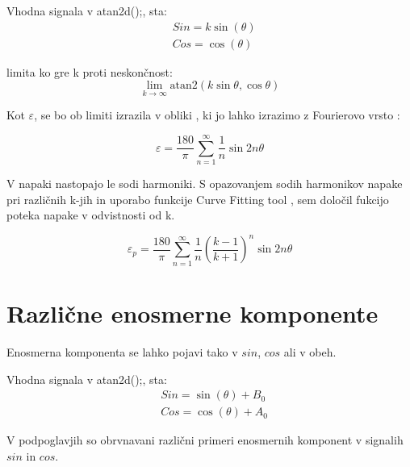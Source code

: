 Vhodna signala v atan2d();, sta:
\begin{eqnarray}
\label{equ:def_sin_ama}
&Sin = k \sin(\theta)\\
\label{equ:def_cos_amp}
&Cos =\cos(\theta)
\end{eqnarray}

limita ko gre k proti neskončnost:
\begin{equation}
\lim_{k \rightarrow \infty} \mathrm{atan2}(k \sin{\theta},\cos{\theta})
\end{equation}


Kot $\varepsilon$, se bo ob limiti  izrazila v obliki , ki jo lahko izrazimo z Fourierovo vrsto \cite{Matematika1}:

\begin{equation}
\varepsilon = \frac{180}{\pi}\sum_{n=1}^{\infty}\frac{1}{n} \sin 2 n \theta
\end{equation}

V napaki nastopajo le sodi harmoniki. S opazovanjem sodih harmonikov napake pri različnih k-jih in uporabo funkcije Curve Fitting tool \cite{cftool}, sem določil fukcijo poteka napake v odvistnosti od k. 

\begin{equation}
\label{vrsta_k}
\varepsilon_p =\frac{180}{\pi}\sum_{n=1}^{\infty}\frac{1}{n}(\frac{k-1}{k+1})^n \sin 2 n \theta
\end{equation}



\newpage


\section{Različne enosmerne komponente}

Enosmerna komponenta se lahko pojavi tako v $sin$, $cos$ ali v obeh.

Vhodna signala v atan2d();, sta:
\begin{eqnarray}
\label{equ:def_sin_ama}
&Sin = \sin(\theta) + B_0\\
\label{equ:def_cos_amp}
&Cos =\cos(\theta) +A_0
\end{eqnarray}

V podpoglavjih so obrvnavani različni primeri enosmernih komponent v signalih $sin$ in $cos$.
